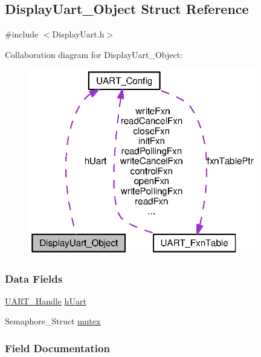 \subsection{Display\+Uart\+\_\+\+Object Struct Reference}
\label{struct_display_uart___object}


{\ttfamily \#include $<$Display\+Uart.\+h$>$}



Collaboration diagram for Display\+Uart\+\_\+\+Object\+:
\nopagebreak
\begin{figure}[H]
\begin{center}
\leavevmode
\includegraphics[width=282pt]{struct_display_uart___object__coll__graph}
\end{center}
\end{figure}
\subsubsection*{Data Fields}
\begin{DoxyCompactItemize}
\item 
\hyperlink{_u_a_r_t_8h_a13cc669fae768d8212e6491ce71b28af}{U\+A\+R\+T\+\_\+\+Handle} \hyperlink{struct_display_uart___object_a8b35f7e4e65999298f8e461817545f5c}{h\+Uart}
\item 
Semaphore\+\_\+\+Struct \hyperlink{struct_display_uart___object_a171c8429febbdb95f53041c14ab3cb4f}{mutex}
\end{DoxyCompactItemize}


\subsubsection{Field Documentation}
